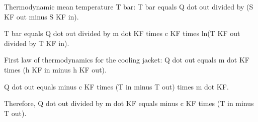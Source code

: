 Thermodynamic mean temperature T bar:  
T bar equals Q dot out divided by (S KF out minus S KF in).  

T bar equals Q dot out divided by m dot KF times c KF times ln(T KF out divided by T KF in).  

First law of thermodynamics for the cooling jacket:  
Q dot out equals m dot KF times (h KF in minus h KF out).  

Q dot out equals minus c KF times (T in minus T out) times m dot KF.  

Therefore, Q dot out divided by m dot KF equals minus c KF times (T in minus T out).